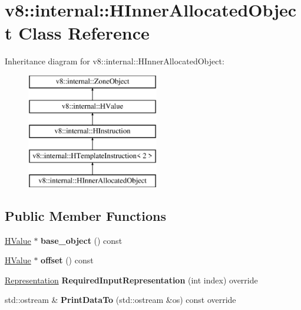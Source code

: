 \hypertarget{classv8_1_1internal_1_1_h_inner_allocated_object}{}\section{v8\+:\+:internal\+:\+:H\+Inner\+Allocated\+Object Class Reference}
\label{classv8_1_1internal_1_1_h_inner_allocated_object}
Inheritance diagram for v8\+:\+:internal\+:\+:H\+Inner\+Allocated\+Object\+:\begin{figure}[H]
\begin{center}
\leavevmode
\includegraphics[height=5.000000cm]{classv8_1_1internal_1_1_h_inner_allocated_object}
\end{center}
\end{figure}
\subsection*{Public Member Functions}
\begin{DoxyCompactItemize}
\item 
\hyperlink{classv8_1_1internal_1_1_h_value}{H\+Value} $\ast$ {\bfseries base\+\_\+object} () const \hypertarget{classv8_1_1internal_1_1_h_inner_allocated_object_a93d187dca346b14d16eae49d4be61061}{}\label{classv8_1_1internal_1_1_h_inner_allocated_object_a93d187dca346b14d16eae49d4be61061}

\item 
\hyperlink{classv8_1_1internal_1_1_h_value}{H\+Value} $\ast$ {\bfseries offset} () const \hypertarget{classv8_1_1internal_1_1_h_inner_allocated_object_ae120c9ed273ebd47fa617844473b4aec}{}\label{classv8_1_1internal_1_1_h_inner_allocated_object_ae120c9ed273ebd47fa617844473b4aec}

\item 
\hyperlink{classv8_1_1internal_1_1_representation}{Representation} {\bfseries Required\+Input\+Representation} (int index) override\hypertarget{classv8_1_1internal_1_1_h_inner_allocated_object_a7b882b446e66500d704415dfaba8a15e}{}\label{classv8_1_1internal_1_1_h_inner_allocated_object_a7b882b446e66500d704415dfaba8a15e}

\item 
std\+::ostream \& {\bfseries Print\+Data\+To} (std\+::ostream \&os) const  override\hypertarget{classv8_1_1internal_1_1_h_inner_allocated_object_a07ff31118074ddf7878a8acbf07a73d5}{}\label{classv8_1_1internal_1_1_h_inner_allocated_object_a07ff31118074ddf7878a8acbf07a73d5}

\end{DoxyCompactItemize}
